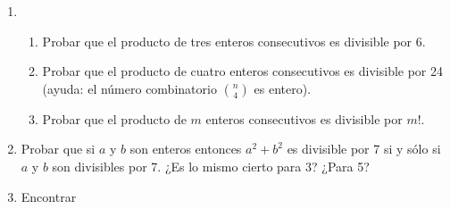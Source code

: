 \documentclass[a4paper,12pt,twoside,spanish,reqno]{amsbook}
\numberwithin{equation}{section}
\begin{document}
\begin{enumerate}
\item 
    \begin{enumerate}
        \item Probar que el producto de tres enteros consecutivos es divisible por 6.
        \item Probar que el producto de cuatro enteros consecutivos es divisible por 24 (ayuda: el número combinatorio $\binom{n}{4}$ es entero).
        \item Probar que el producto de $m$  enteros consecutivos es divisible por $m!$.
    \end{enumerate}


\item Probar que si $a$ y $b$ son enteros entonces $a^2+b^2$ es divisible por 7 si y sólo si $a$ y $b$ son divisibles por 7. ¿Es lo mismo cierto para 3? ¿Para 5?



\item Encontrar 



\end{enumerate}
\end{document}
